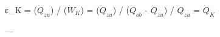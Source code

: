 ε_K = (\(\dot{Q}_{zu}\)) / (\(\dot{W}_{K}\))  
= (\(\dot{Q}_{zu}\)) / (\(\dot{Q}_{ob}\) - \(\dot{Q}_{zu}\))  
/ \(\dot{Q}_{zu}\) = \(\dot{Q}_{K}\)  

---